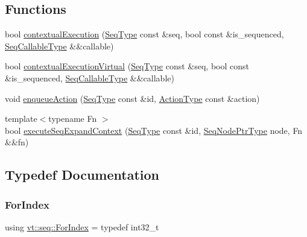 \subsection*{Functions}
\begin{DoxyCompactItemize}
\item 
bool \hyperlink{namespacevt_1_1seq_a78025a51c7d218cb51512f57ea3f761a}{contextual\+Execution} (\hyperlink{namespacevt_1_1seq_a3b612da217ac669d39c159f134ab8434}{Seq\+Type} const \&seq, bool const \&is\+\_\+sequenced, \hyperlink{namespacevt_1_1seq_ab8c5e0c5aec2bd712a2b57e2e4553de6}{Seq\+Callable\+Type} \&\&callable)
\item 
bool \hyperlink{namespacevt_1_1seq_ab924e025689b220c9a7876bfecb24741}{contextual\+Execution\+Virtual} (\hyperlink{namespacevt_1_1seq_a3b612da217ac669d39c159f134ab8434}{Seq\+Type} const \&seq, bool const \&is\+\_\+sequenced, \hyperlink{namespacevt_1_1seq_ab8c5e0c5aec2bd712a2b57e2e4553de6}{Seq\+Callable\+Type} \&\&callable)
\item 
void \hyperlink{namespacevt_1_1seq_aaf4240d6148f7ce0e8f1c3bd31705685}{enqueue\+Action} (\hyperlink{namespacevt_1_1seq_a3b612da217ac669d39c159f134ab8434}{Seq\+Type} const \&id, \hyperlink{namespacevt_ae0a5a7b18cc99d7b732cb4d44f46b0f3}{Action\+Type} const \&action)
\item 
{\footnotesize template$<$typename Fn $>$ }\\bool \hyperlink{namespacevt_1_1seq_abccaa18f7df5f19a80dcf62a489d3eb0}{execute\+Seq\+Expand\+Context} (\hyperlink{namespacevt_1_1seq_a3b612da217ac669d39c159f134ab8434}{Seq\+Type} const \&id, \hyperlink{namespacevt_1_1seq_ae6a4874b585be0612aaca32ca6d2d191}{Seq\+Node\+Ptr\+Type} node, Fn \&\&fn)
\end{DoxyCompactItemize}


\subsection{Typedef Documentation}
\mbox{\label{namespacevt_1_1seq_a6c570c39bac8f93bafe0bf8a0db8c798}} 
\subsubsection{\texorpdfstring{For\+Index}{ForIndex}}
{\footnotesize\ttfamily using \hyperlink{namespacevt_1_1seq_a6c570c39bac8f93bafe0bf8a0db8c798}{vt\+::seq\+::\+For\+Index} = typedef int32\+\_\+t}

